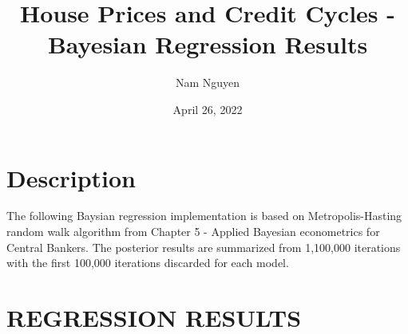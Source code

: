 \documentclass[
  12pt,
]{article}
\title{House Prices and Credit Cycles - Bayesian Regression Results}
\author{Nam Nguyen}
\date{April 26, 2022}
\begin{document}
\maketitle

\hypertarget{description}{%
\section{Description}\label{description}}

The following Baysian regression implementation is based on Metropolis-Hasting random walk algorithm from Chapter 5 - Applied Bayesian econometrics for Central Bankers. The posterior results are summarized from 1,100,000 iterations with the first 100,000 iterations discarded for each model.

\hypertarget{regression-results}{%
\section{REGRESSION RESULTS}\label{regression-results}}
\end{document}
